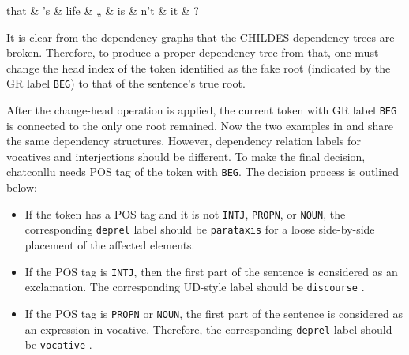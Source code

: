 \begin{minipage}{\widefigurewidth}
\begin{dependency}[edge slant=3pt]
    \begin{deptext}[column sep=1cm]
    that \& 's \& life \& „ \& is \& n't \& it \& ?\\
    \end{deptext}
\end{dependency}
\end{minipage}
\label{fig:taggr}


It is clear from the dependency graphs that the CHILDES dependency trees are broken. Therefore, to produce a proper dependency tree from that, one must change the head index of the token identified as the fake root (indicated by the GR label \texttt{BEG}) to that of the sentence's true root.

After the change-head operation is applied, the current token with GR label \texttt{BEG} is connected to the only one root remained. Now the two examples in  and  share the same dependency structures. However, dependency relation labels for vocatives and interjections should be different. To make the final decision, chatconllu needs POS tag of the token with \texttt{BEG}. The decision process is outlined below:\\

\begin{itemize}
    \item If the token has a POS tag and it is not \texttt{INTJ}, \texttt{PROPN}, or \texttt{NOUN}, the corresponding \texttt{deprel}  label should be \texttt{parataxis} for a loose side-by-side placement of the affected elements.
    \item If the POS tag is \texttt{INTJ}, then the first part of the sentence is considered as an exclamation. The corresponding UD-style label should be \texttt{discourse} .
    \item If the POS tag is \texttt{PROPN} or \texttt{NOUN}, the first part of the sentence is considered as an expression in vocative. Therefore, the corresponding \texttt{deprel} label should be \texttt{vocative} .
\end{itemize}

